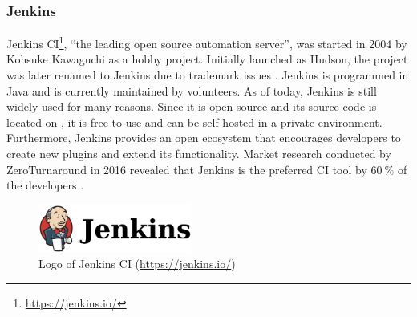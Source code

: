 
\subsubsection{Jenkins}
Jenkins CI\footnote{\url{https://jenkins.io/}}, ``the leading open source automation server'', was started in 2004 by Kohsuke Kawaguchi as a hobby project. Initially launched as Hudson, the project was later renamed to Jenkins due to trademark issues \cite{SmartJenkinsDefinitive}. Jenkins is programmed in Java and is currently maintained by volunteers. As of today, Jenkins is still widely used for many reasons. Since it is open source and its source code is located on \github{}, it is free to use and can be self-hosted in a private environment. Furthermore, Jenkins provides an open ecosystem that encourages developers to create new plugins and extend its functionality. Market research conducted by ZeroTurnaround in 2016 revealed that Jenkins is the preferred CI tool by $\SI{60}{\percent}$ of the developers \cite{maple_2016}.

\begin{figure}[htbp!]
	\centering
	\includegraphics[width=0.45\textwidth]{assets/images/jenkins.pdf}
	\caption{Logo of Jenkins CI (\url{https://jenkins.io/})}
	\label{fig:jenkins}
\end{figure}